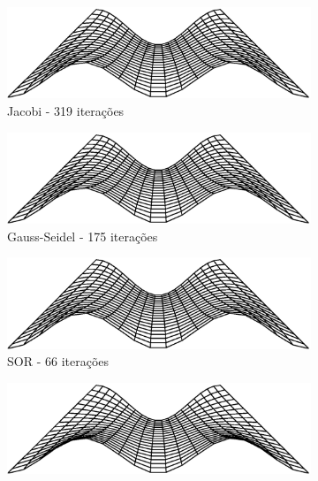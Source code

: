 \documentclass{article}
\begin{document}
		\begin{figure}
		\centering
			\begin{subfigure}[b]{0.45\textwidth}
				\centering
				\includegraphics[width=\textwidth]{figures/m-jacobi.eps}
				\caption{Jacobi - 319 iterações}
			\end{subfigure}
			\begin{subfigure}[b]{0.45\textwidth}
				\centering
				\includegraphics[width=\textwidth]{figures/m-gauss.eps}
				\caption{Gauss-Seidel - 175 iterações}
			\end{subfigure}
			\begin{subfigure}[b]{0.45\textwidth}
				\centering
				\includegraphics[width=\textwidth]{figures/m-sor.eps}
				\caption{SOR - 66 iterações}
			\end{subfigure}
			\begin{subfigure}[b]{0.45\textwidth}
				\centering
				\includegraphics[width=\textwidth]{figures/m-thomas.eps}

\end{subfigure}
\end{figure}
\end{document}
